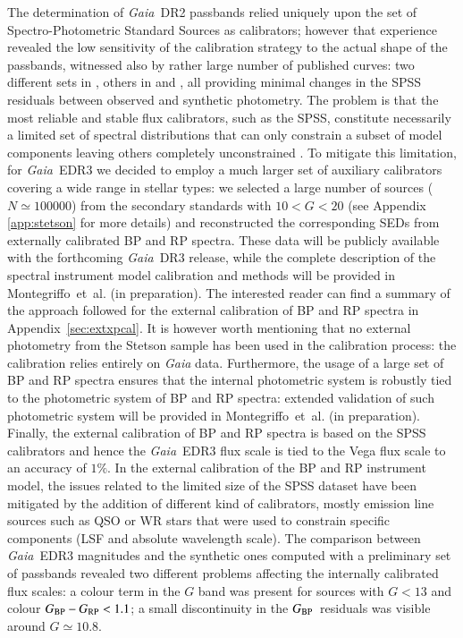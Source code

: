 \documentclass{aa}
\newcommand{\gaia}{\textit{Gaia}\xspace}
\newcommand{\gbp}{\ensuremath{G_{\rm BP}}\xspace}
\newcommand{\bprp}{\ensuremath{G_{\rm BP}-G_{\rm RP}}\xspace}
\newcommand{\drt}{\gaia~DR2\xspace}
\newcommand{\edr}{\gaia~EDR3\xspace}
\newcommand{\drthree}{\gaia~DR3\xspace}
\newcommand{\xp}{BP and RP\xspace}
\newcommand{\citeip}[1]{#1~et~al. (in preparation)\xspace}
\newcommand{\appref}[1]{Appendix~\ref{sec:#1}}
\begin{document}
The determination of \drt passbands relied uniquely upon the set of Spectro-Photometric Standard Sources \citep[SPSS, ][see also Appendix~B]{SPSS, SPSS2, SPSS3} as calibrators; however that experience revealed the low sensitivity of the calibration strategy to the actual shape of the passbands, witnessed also by rather large number of published curves: two different sets in \cite{Phot_DR2}, others in \cite{Weiler2017} and \cite{Maizap}, all providing minimal changes in the SPSS residuals between observed and synthetic photometry. The problem is that the most reliable and stable flux calibrators, such as the SPSS, constitute necessarily a limited set of spectral distributions that can only constrain a subset of model components leaving others completely unconstrained \citep{Weiler2018}. To mitigate this limitation, for \edr we decided to employ a much larger set of auxiliary calibrators covering a wide range in stellar types: we selected a large number of sources ($N\simeq100000$) from the \cite{2000PASP..112..925S} secondary standards with $10<G<20$ (see Appendix \ref{app:stetson} for more details) and reconstructed the corresponding SEDs from externally calibrated \xp spectra. These data will be publicly available with the forthcoming \drthree release, while the complete description of the spectral instrument model calibration and methods will be provided in \citeip{Montegriffo}. The interested reader can find a summary of the approach followed for the external calibration of \xp spectra in \appref{extxpcal}. It is however worth mentioning that no external photometry from the Stetson sample has been used in the calibration process: the calibration relies entirely on \gaia data. Furthermore, the usage of a large set of \xp spectra ensures that the internal photometric system is robustly tied to the photometric system of \xp spectra: extended validation of such photometric system will be provided in \citeip{Montegriffo}. Finally, the external calibration of \xp spectra is based on the SPSS calibrators and hence the \edr flux scale is tied to the Vega flux scale to an accuracy of $1\%$. In the external calibration of the \xp instrument model, the issues related to the limited size of the SPSS dataset have been mitigated by the addition of different kind of calibrators, mostly emission line sources such as QSO or WR stars that were used to constrain specific components (LSF and absolute wavelength scale).
%
The comparison between \edr magnitudes and the synthetic ones computed with a preliminary set of passbands revealed two different problems affecting the internally calibrated flux scales: a colour term in the $G$ band was present for sources with $G<13$ and colour $\bprp < 1.1$; a small discontinuity in the \gbp\ residuals was visible around $G\simeq 10.8$.
\end{document}
